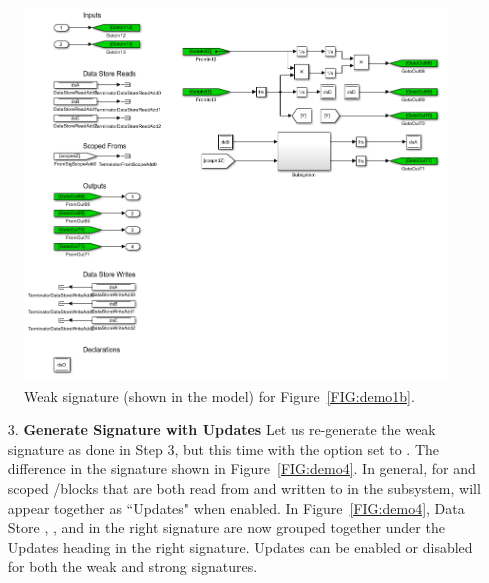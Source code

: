 \documentclass{article}
\begin{document}
\begin{figure}[ht!]
	\centering
	\includegraphics[width=\textwidth]{../figs/Demo3}
	\caption{Weak signature (shown in the model) for Figure~\ref{FIG:demo1b}.}
	\label{FIG:demo3}
\end{figure}

\begin{enumerate}
	\item[3.] \textbf{Generate Signature with Updates} Let us re-generate the weak signature as done in Step 3, but this time with the  option set to . The difference in the signature shown in Figure~\ref{FIG:demo4}. In general, for \DSM and scoped \goto/\from blocks that are both read from and written to in the subsystem, will appear together as ``Updates" when enabled. In Figure~\ref{FIG:demo4}, Data Store , , and  in the right signature are now grouped together under the Updates heading in the right signature. Updates can be enabled or disabled for both the weak and strong signatures.
\end{enumerate}
\end{document}

